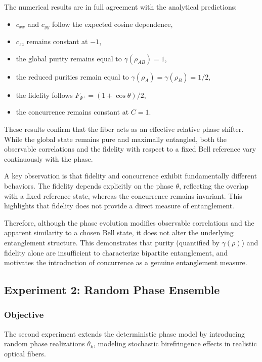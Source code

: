 \documentclass[a4paper]{article}
\begin{document}
The numerical results are in full agreement with the analytical predictions:
\begin{itemize}
    \item \(c_{xx}\) and \(c_{yy}\) follow the expected cosine dependence,
    \item \(c_{zz}\) remains constant at \(-1\),
    \item the global purity remains equal to \(\gamma(\rho_{AB})=1\),
    \item the reduced purities remain equal to \(\gamma(\rho_A)=\gamma(\rho_B)=1/2\),
    \item the fidelity follows \(F_{\Psi^+}=(1+\cos\theta)/2\),
    \item the concurrence remains constant at \(C=1\).
\end{itemize}

These results confirm that the fiber acts as an effective relative phase shifter. While the global state remains pure and maximally entangled, both the observable correlations and the fidelity with respect to a fixed Bell reference vary continuously with the phase.

A key observation is that fidelity and concurrence exhibit fundamentally different behaviors. The fidelity depends explicitly on the phase \(\theta\), reflecting the overlap with a fixed reference state, whereas the concurrence remains invariant. This highlights that fidelity does not provide a direct measure of entanglement.

Therefore, although the phase evolution modifies observable correlations and the apparent similarity to a chosen Bell state, it does not alter the underlying entanglement structure. This demonstrates that purity (quantified by \(\gamma(\rho)\)) and fidelity alone are insufficient to characterize bipartite entanglement, and motivates the introduction of concurrence as a genuine entanglement measure.

\subsection{Experiment 2: Random Phase Ensemble}

\subsubsection{Objective}

The second experiment extends the deterministic phase model by introducing random phase realizations \(\theta_k\), modeling stochastic birefringence effects in realistic optical fibers.
\end{document}
